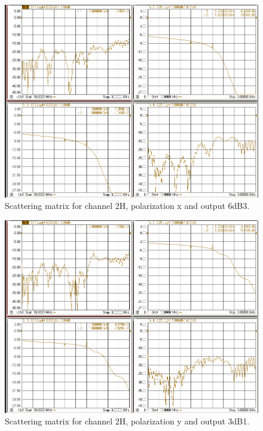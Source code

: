 \documentclass[12pt,a4paper,oneside]{article}
\begin{document}
\begin{figure}[H]
\centering
\includegraphics[width=0.9\linewidth]{VNA_results/2Hx_6dB3.png}
\caption{Scattering matrix for channel 2H, polarization x and output 6dB3.}
\label{fig:2Hx_6dB3}
\end{figure}


\begin{figure}[H]
\centering
\includegraphics[width=0.9\linewidth]{VNA_results/2Hy_3dB1.png}
\caption{Scattering matrix for channel 2H, polarization y and output 3dB1.}
\label{fig:2Hy_3dB1}
\end{figure}
\end{document}

